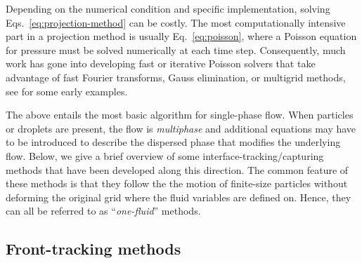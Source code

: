 Depending on the numerical condition and specific implementation, solving Eqs.\ \eqref{eq:projection-method} can be costly. The most computationally intensive part in a projection method is usually Eq.\ \eqref{eq:poisson}, where a Poisson equation for pressure must be solved numerically at each time step. Consequently, much work has gone into developing fast or iterative Poisson solvers that take advantage of fast Fourier transforms, Gauss elimination, or multigrid methods, see \cite{Buzbee_Golub_Nielson, Swarztrauber1977, multigrid_Brandt, Wesseling} for some early examples.

The above entails the most basic algorithm for single-phase flow.
When particles or droplets are present, the flow is \emph{multiphase} and additional equations may have to be introduced to describe the dispersed phase that modifies the underlying flow.
Below, we give a brief overview of some interface-tracking/capturing methods that have been developed along this direction.
The common feature of these methods is that they follow the the motion of finite-size particles without deforming the original grid where the fluid variables are defined on.
Hence, they can all be referred to as ``\emph{one-fluid}'' methods.


\subsection{Front-tracking methods}

